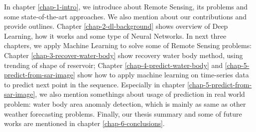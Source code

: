 In chapter \ref{chap-1-intro}, we introduce about Remote Sensing, its problems and some state-of-the-art approaches. We also mention about our contributions and provide outlines. Chapter \ref{chap-2-dl-background} shows overview of Deep Learning, how it works and some type of Neural Networks. In next three chapters, we apply Machine Learning to solve some of Remote Sensing problems: Chapter \ref{chap-3-recover-water-body} show recovery water body method, using trending of shape of reservoir; Chapter \ref{chap-4-predict-water-body} and \ref{chap-5-predict-from-sar-image} show how to apply machine learning on time-series data to predict next point in the sequence. Especially in chapter \ref{chap-5-predict-from-sar-image}, we also mention somethings about usage of prediction in real world problem: water body area anomaly detection, which is mainly as same as other weather forecasting problems. Finally, our thesis summary and some of future works are mentioned in chapter \ref{chap-6-conclusions}. 
